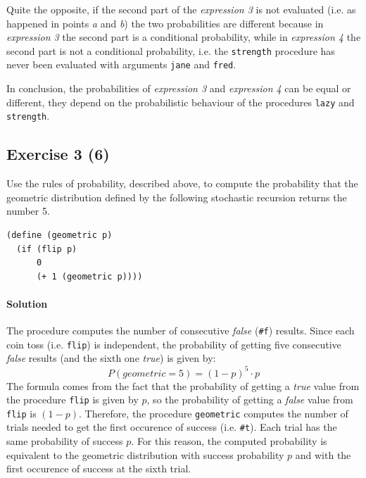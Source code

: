\begin{itemize}
        Quite the opposite, if the second part of the \textit{expression 3} is not evaluated (i.e. as happened in points \textit{a}
        and \textit{b}) the two probabilities are different because in \textit{expression 3} the second part is a conditional
        probability, while in \textit{expression 4} the second part is not a conditional probability, i.e. the \texttt{strength}
        procedure has never been evaluated with arguments \texttt{\textquotesingle jane} and \texttt{\textquotesingle fred}.

        In conclusion, the probabilities of \textit{expression 3} and \textit{expression 4} can be equal or different, they depend
        on the probabilistic behaviour of the procedures \texttt{lazy} and \texttt{strength}.
\end{itemize}

\subsection*{Exercise 3 (6)}
Use the rules of probability, described above, to compute the probability that the geometric distribution 
defined by the following stochastic recursion returns the number 5.

\begin{lstlisting}
(define (geometric p)
  (if (flip p)
      0
      (+ 1 (geometric p))))
\end{lstlisting}

\paragraph{Solution}
The procedure computes the number of consecutive \textit{false} (\texttt{\#f}) results. Since each coin toss (i.e. \texttt{flip}) is 
independent, the probability of getting five consecutive \textit{false} results (and the sixth one \textit{true}) is given by:
\[ P(geometric = 5) = (1 - p)^{5} \cdot p \]
The formula comes from the fact that the probability of getting a \textit{true} value from the procedure \texttt{flip} is given by
$p$, so the probability of getting a \textit{false} value from \texttt{flip} is $ (1 - p) $.
Therefore, the procedure \texttt{geometric} computes the number of trials needed to get the first occurence of success (i.e. \texttt{\#t}).
Each trial has the same probability of success $p$.
For this reason, the computed probability is equivalent to the geometric distribution with success probability $p$ and with the 
first occurence of success at the sixth trial.


